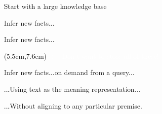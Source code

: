 \begin{frame}[noframenumbering]{Start with a large knowledge base}
\begin{center}
  \teaserManyPremises
\end{center}
\end{frame}

\begin{frame}[noframenumbering]{Infer new facts...}
\begin{center}
  \teaserBlindInferenceNaturalOrderBlind
\end{center}
\end{frame}

\begin{frame}[noframenumbering]{Infer new facts...}
\begin{center}
  \teaserBlindInferenceNaturalOrder
\end{center}
\pause
\begin{textblock*}{6cm}(5.5cm,7.6cm)
  \textcolor<1-1>{white}{$\leftarrow$ Don't want to store all of these!}
\end{textblock*}
\end{frame}

\begin{frame}[noframenumbering]{Infer new facts...on demand from a query...}
\begin{center}
  \teaserBlindInference
\end{center}
\end{frame}

\begin{frame}[noframenumbering]{...Using text as the meaning representation...}
\begin{center}
  \teaserInference
\end{center}
\end{frame}

\begin{frame}[noframenumbering]{...Without aligning to any particular premise.}
\begin{center}
  \teaserFullDerivation
\end{center}
\end{frame}


